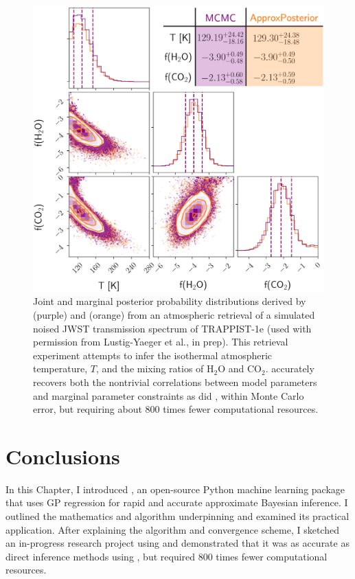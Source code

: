\begin{figure}
\centering
	\includegraphics[width=\textwidth]{emceeAPComparison.png}
   \caption{Joint and marginal posterior probability distributions derived by \emcee (purple) and \approxposterior (orange) from an atmospheric retrieval of a simulated noised JWST transmission spectrum of TRAPPIST-1e (used with permission from Lustig-Yaeger et al., in prep). This retrieval experiment attempts to infer the isothermal atmospheric temperature, $T$, and the mixing ratios of H$_2$O and CO$_2$. \approxposterior accurately recovers both the nontrivial correlations between model parameters and marginal parameter constraints as did \emcee, within Monte Carlo error, but requiring about 800 times fewer computational resources.}%
    \label{AP:fig:comparison}%
\end{figure}

\section{Conclusions}

In this Chapter, I introduced \approxposterior, an open-source Python machine learning package that uses GP regression for rapid and accurate approximate Bayesian inference. I outlined the mathematics and algorithm underpinning \approxposterior and examined its practical application. After explaining the \approxposterior algorithm and convergence scheme, I sketched an in-progress research project using \approxposterior and demonstrated that it was as accurate as direct inference methods using \emcee, but required 800 times fewer computational resources. 

